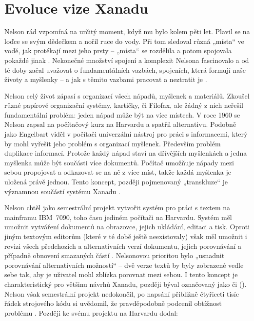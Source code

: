 \section{Evoluce vize Xanadu}

Nelson rád vzpomíná na určitý moment, když mu bylo kolem pěti let. Plavil se na loďce se svým dědečkem a nořil ruce do vody. Při tom sledoval různá „místa“ ve vodě, jak protékají mezi jeho prsty -- „místa“ se rozdělila a potom spojovala pokaždé jinak \autocites{Herzog2016}[66]{Barnet2014}. Nekonečné množství spojení a komplexit Nelsona fascinovalo a od té doby začal uvažovat o fundamentálních vazbách, spojeních, která formují naše životy a myšlenky -- a jak s těmito vazbami pracovat a neztratit je \autocite[66]{Barnet2014}.

Nelson celý život zápasí s organizací všech nápadů, myšlenek a materiálů. Zkoušel různé papírové organizační systémy, kartičky, či Filofax, ale žádný z nich neřešil fundamentální problém: jeden nápad může být na více místech. V roce 1960 se Nelson zapsal na počítačový kurz na Harvardu a spatřil alternativu. Podobně jako Engelbart viděl v počítači univerzální nástroj pro práci s informacemi, který by mohl vyřešit jeho problém s organizací myšlenek. Především problém duplikace informací. Protože každý nápad staví na dřívějších myšlenkách a jedna myšlenka může být součásti více dokumentů. Počítač umožňuje nápady mezi sebou propojovat a odkazovat se na ně z více míst, takže každá myšlenka je uložená právě jednou. Tento koncept, později pojmenovaný „transkluze“ je významnou součástí systému Xanadu \autocite[70]{Barnet2014}.

\label{p:evol:harvard}
Nelson chtěl jako semestrální projekt vytvořit systém pro práci s textem na mainframu IBM~7090, toho času jediném počítači na Harvardu. Systém měl umožnit vytváření dokumentů na obrazovce, jejich ukládání, editaci a tisk. Oproti jiným textovým editorům (které v té době ještě neexistovaly) však měl umožnit i revizi všech předchozích a alternativních verzí dokumentu, jejich porovnávání a případně obnovení smazaných částí \autocite[71]{Barnet2014}. Nelsonovou prioritou bylo „usnadnit porovnávání alternativních možností“ \autocite[1/25]{LitMachines} -- dvě verze textů by byly zobrazené vedle sebe tak, aby je uživatel mohl zblízka porovnat mezi sebou. I tento koncept je charakteristický pro většinu návrhů Xanadu, později býval označovaný jako  či  (). Nelson však semestrální projekt nedokončil, po napsání přibližně čtyřiceti tisíc řádek strojového kódu si uvědomil, že pravděpodobně podcenil obtížnost problému \autocite[14]{Rheingold1985}. Později ke svému projektu na Harvardu dodal: 

